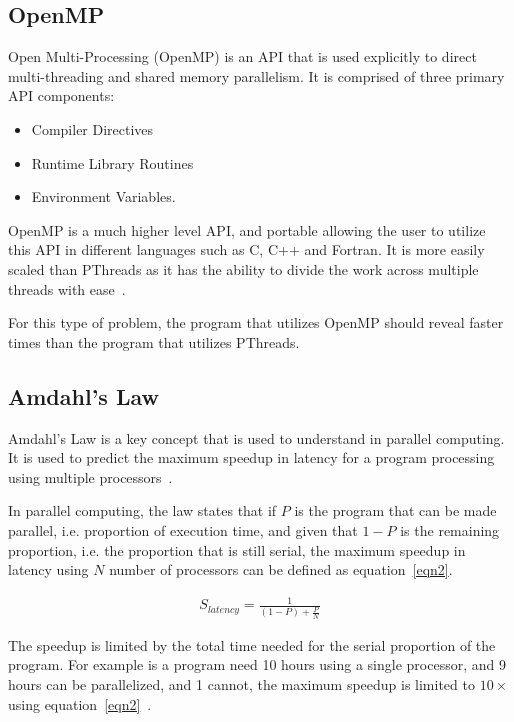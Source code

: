 \documentclass[10pt, conference]{IEEEtran}
\begin{document}
\subsection{OpenMP}
\label{OpenMP}
Open Multi-Processing (OpenMP) is an API that is used explicitly to direct multi-threading and shared memory parallelism. It is comprised of three primary API components:

\begin{itemize}
\item Compiler Directives
\item Runtime Library Routines
\item Environment Variables\cite{OpenMP}.
\end{itemize}

OpenMP is a much higher level API, and portable allowing the user to utilize this API in different languages such as C, C++ and Fortran. It is more easily scaled than PThreads as it has the ability to divide the work across multiple threads with ease~\cite{StackOverflow, OpenMP}.

For this type of problem, the program that utilizes OpenMP should reveal faster times than the program that utilizes PThreads.

\subsection{Amdahl's Law}
\label{Amdahl's Law}
Amdahl's Law is a key concept that is used to understand in parallel computing. It is used to predict the maximum speedup in latency for a program processing using multiple processors~\cite{Amdahl}.

In parallel computing, the law states that if $P$ is the program that can be made parallel, i.e. proportion of execution time, and given that $1-P$ is the remaining proportion, i.e. the proportion that is still serial, the maximum speedup in latency using $N$ number of processors can be defined as equation~\ref{eqn2}.

\begin{equation}
\label{eqn2}
\begin{split}
S_{latency} = \frac{1}{(1-P)+\frac{P}{N}}
\end{split}
\end{equation}

The speedup is limited by the total time needed for the serial proportion of the program. For example is a program need 10 hours using a single processor, and 9 hours can be parallelized, and 1 cannot, the maximum speedup is limited to $10\times$ using equation~\ref{eqn2}~\cite{Amdahl}.
\end{document}
